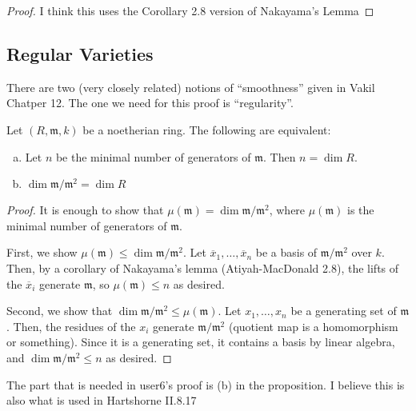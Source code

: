 \begin{proof}

  I think this uses the Corollary 2.8 version of Nakayama's Lemma
\end{proof}

\subsection{Regular Varieties}

There are two (very closely related)
notions of ``smoothness'' given in Vakil Chatper 12.
The one we need for this proof is ``regularity''.

\begin{proposition} \label{prop:regular_def_equiv}
	Let \((R,\mathfrak{m},k)\) be a noetherian ring. 
	The following are equivalent:
	\begin{enumerate}[(a)]
		\item Let \(n\) be the minimal number of generators of
			\(\mathfrak{m}\).
			Then \(n = \dim R\).
		\item \(\dim \mathfrak{m} / \mathfrak{m}^{2}  = \dim R\)
	\end{enumerate}
\end{proposition}

\begin{proof}
	It is enough to show that 
	\(\mu(\mathfrak{m}) = \dim \mathfrak{m} / \mathfrak{m}^{2}\),
	where \(\mu(\mathfrak{m})\) is the minimal number of generators
	of \(\mathfrak{m}\).
	
	First, we show \(\mu(\mathfrak{m}) \leq \dim \mathfrak{m} / \mathfrak{m}^{2}\).
	Let \(\overline{x}_{1}, \ldots, \overline{x}_{n}\) 
	be a basis of \(\mathfrak{m} / \mathfrak{m}^{2}\) 
	over \(k\).
	Then, by a corollary of Nakayama's lemma (Atiyah-MacDonald 2.8),
	the lifts of the \(\overline{x}_{i}\) generate \(\mathfrak{m}\),
	so \(\mu(\mathfrak{m}) \leq n\) as desired.

	Second, we show that 
	\(\dim \mathfrak{m} / \mathfrak{m}^{2} \leq \mu(\mathfrak{m})\).
	Let \(x_{1}, \ldots, x_{n}\) be a generating set of 
	\(\mathfrak{m}\).
	Then, the residues of the \(x_{i}\) generate 
	\(\mathfrak{m} / \mathfrak{m}^{2}\) (quotient map is a 
	homomorphism or something).
	Since it is a generating set, it contains a basis by
	linear algebra, and
	\(\dim \mathfrak{m} / \mathfrak{m}^{2} \leq n\) as desired.
\end{proof}

The part that is needed in user6's proof is (b) in the proposition.
I believe this is also what is used in Hartshorne II.8.17

